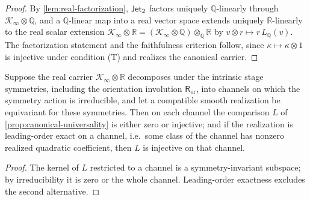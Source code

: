 \begin{proof}
	By \cref{lem:real-factorization}, \(\mathsf{Jet}_2\) factors uniquely
	\(\mathbb Q\)-linearly through
	\(\mathcal K_\infty\otimes\mathbb Q\), and a \(\mathbb Q\)-linear map
	into a real vector space extends uniquely \(\mathbb R\)-linearly to
	the real scalar extension
	\(\mathcal K_\infty\otimes\mathbb R
	=(\mathcal K_\infty\otimes\mathbb Q)\otimes_{\mathbb Q}\mathbb R\)
	by \(v\otimes r\mapsto r\,L_{\mathbb Q}(v)\).  The factorization
	statement and the faithfulness criterion follow, since
	\(\kappa\mapsto\kappa\otimes1\) is injective under condition
	\textup{(T)} and realizes the canonical carrier.
\end{proof}
\begin{proposition}
	\label{prop:equivariant-rigidity}
	Suppose the real carrier \(\mathcal K_\infty\otimes\mathbb R\)
	decomposes under the intrinsic stage symmetries, including the
	orientation involution \(\mathsf R_{\mathrm{or}}\), into channels on
	which the symmetry action is irreducible, and let a compatible smooth
	realization be equivariant for these symmetries.  Then on each
	channel the comparison \(L\) of \cref{prop:canonical-universality} is
	either zero or injective; and if the realization is leading-order
	exact on a channel, i.e.\ some class of the channel has nonzero
	realized quadratic coefficient, then \(L\) is injective on that
	channel.
\end{proposition}
\begin{proof}
	The kernel of \(L\) restricted to a channel is a symmetry-invariant
	subspace; by irreducibility it is zero or the whole channel.
	Leading-order exactness excludes the second alternative.
\end{proof}
